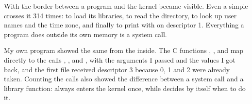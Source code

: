 \documentclass[11pt,a4paper]{article}
\begin{document}

With  the border between a program and the kernel became visible. Even a simple
 crosses it 314 times: to load its libraries, to read the directory, to look up
user names and the time zone, and finally to print with  on descriptor 1.
Everything a program does outside its own memory is a system call.

My own program showed the same from the inside. The C functions , ,
 and  map directly to the calls , , 
and , with the arguments I passed and the values I got back, and the first file
received descriptor 3 because 0, 1 and 2 were already taken. Counting the calls also showed the
difference between a system call and a library function:  always enters the kernel
once, while  decides by itself when to do it.
\end{document}
